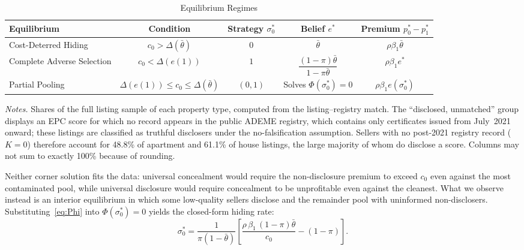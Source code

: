 \documentclass[10pt,letterpaper]{bp-template-concise}
\begin{document}
\begin{table}[h]
\centering
\caption{Equilibrium Regimes}
\label{tab:equilibria}
\small\renewcommand{\arraystretch}{1.5}
\begin{tabular}{lcccc}
\toprule\toprule
\textbf{Equilibrium} & \textbf{Condition} & \textbf{Strategy $\sigma_0^*$} & \textbf{Belief $e^*$} & \textbf{Premium $p_0^*-p_1^*$} \\
\midrule
Cost-Deterred Hiding       & $c_0>\Delta(\bar{\theta})$                     & $0$     & $\bar{\theta}$                                          & $\rho\beta_1\bar{\theta}$ \\
Complete Adverse Selection & $c_0<\Delta(e(1))$                             & $1$     & $\dfrac{(1-\pi)\bar{\theta}}{1-\pi\bar{\theta}}$        & $\rho\beta_1 e^*$ \\[6pt]
Partial Pooling            & $\Delta(e(1))\leq c_0\leq\Delta(\bar{\theta})$ & $(0,1)$ & Solves $\Phi(\sigma_0^*)=0$                             & $\rho\beta_1 e(\sigma_0^*)$ \\
\bottomrule\bottomrule
\end{tabular}
\vspace{0.5em}
\begin{minipage}{\linewidth}
\footnotesize\textit{Notes.} Shares of the full listing sample of each property type, computed from the
listing--registry match. The ``disclosed, unmatched'' group displays an EPC score for which no record
appears in the public ADEME registry, which contains only certificates issued from July~2021 onward;
these listings are classified as truthful disclosers under the no-falsification assumption. Sellers
with no post-2021 registry record ($K=0$) therefore account for 48.8\% of apartment and 61.1\% of
house listings, the large majority of whom do disclose a score. Columns may not sum to exactly 100\%
because of rounding.
\end{minipage}
\end{table}

Neither corner solution fits the data: universal concealment would require the non-disclosure premium to exceed $c_0$ even against the most contaminated pool, while universal disclosure would require concealment to be unprofitable even against the cleanest. What we observe instead is an interior equilibrium in which some low-quality sellers disclose and the remainder pool with uninformed non-disclosers. Substituting~\eqref{eq:Phi} into $\Phi(\sigma_0^*)=0$ yields the closed-form hiding rate:
\begin{equation}
    \sigma_0^* = \frac{1}{\pi(1-\bar{\theta})}\left[\frac{\rho\,\beta_1\,(1-\pi)\bar{\theta}}{c_0} - (1-\pi)\right].
    \label{eq:pp_sigma}
\end{equation}
\end{document}
